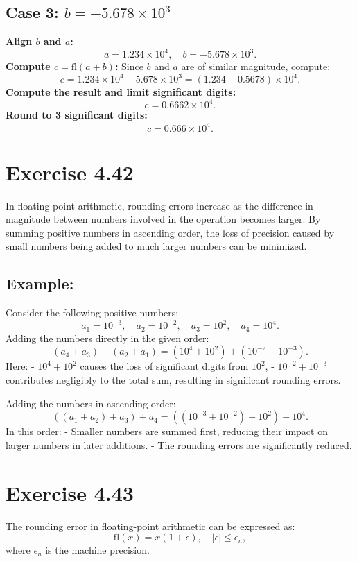 \documentclass{article}
\begin{document}
\subsection{Case 3: \( b = -5.678 \times 10^3 \)}
\textbf{Align \( b \) and \( a \):}  
   \[
   a = 1.234 \times 10^4, \quad b = -5.678 \times 10^3.
   \]
\textbf{Compute \( c = \text{fl}(a + b) \):}  
   Since \( b \) and \( a \) are of similar magnitude, compute:
   \[
   c = 1.234 \times 10^4 - 5.678 \times 10^3 = (1.234 - 0.5678) \times 10^4.
   \]
\textbf{Compute the result and limit significant digits:}  
   \[
   c = 0.6662 \times 10^4.
   \]
\textbf{Round to 3 significant digits:}  
   \[
   c = 0.666 \times 10^4.
   \]


\section*{Exercise 4.42}
In floating-point arithmetic, rounding errors increase as the difference in magnitude between numbers involved in the operation becomes larger. By summing positive numbers in ascending order, the loss of precision caused by small numbers being added to much larger numbers can be minimized.

\subsection{Example:}
Consider the following positive numbers:  
\[
a_1 = 10^{-3}, \quad a_2 = 10^{-2}, \quad a_3 = 10^2, \quad a_4 = 10^4.
\]
Adding the numbers directly in the given order:
\[
(a_4 + a_3) + (a_2 + a_1) = (10^4 + 10^2) + (10^{-2} + 10^{-3}).
\]
Here:
- \( 10^4 + 10^2 \) causes the loss of significant digits from \( 10^2 \),
- \( 10^{-2} + 10^{-3} \) contributes negligibly to the total sum, resulting in significant rounding errors.

Adding the numbers in ascending order:
\[
((a_1 + a_2) + a_3) + a_4 = ((10^{-3} + 10^{-2}) + 10^2) + 10^4.
\]
In this order:
- Smaller numbers are summed first, reducing their impact on larger numbers in later additions.
- The rounding errors are significantly reduced.




\section{Exercise 4.43}
The rounding error in floating-point arithmetic can be expressed as:
\[
\text{fl}(x) = x (1 + \epsilon), \quad |\epsilon| \leq \epsilon_u,
\]
where \( \epsilon_u \) is the machine precision.
\end{document}
